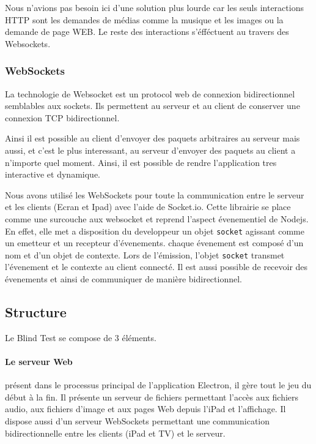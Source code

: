 Nous n'avions pas besoin ici d'une solution plus lourde car les seuls interactions HTTP sont les demandes de médias comme la musique et les images ou la demande de page WEB.
Le reste des interactions s'éfféctuent au travers des Websockets.

\subsubsection{WebSockets}

La technologie de Websocket est un protocol web de connexion bidirectionnel semblables aux sockets.
Ils permettent au serveur et au client de conserver une connexion TCP bidirectionnel.

Ainsi il est possible au client d'envoyer des paquets arbitraires au serveur mais aussi, et c'est le plus interessant, au serveur d'envoyer des paquets au client a n'importe quel moment.
Ainsi, il est possible de rendre l'application tres interactive et dynamique.

Nous avons utilisé les WebSockets pour toute la communication entre le serveur et les clients (Ecran et Ipad) avec l'aide de Socket.io.
Cette librairie se place comme une surcouche aux websocket et reprend l'aspect évenementiel de Nodejs.
En effet, elle met a disposition du developpeur un objet \texttt{socket} agissant comme un emetteur et un recepteur d'évenements.
chaque évenement est composé d'un nom et d'un objet de contexte.
Lors de l'émission, l'objet \texttt{socket} transmet l'évenement et le contexte au client connecté.
Il est aussi possible de recevoir des évenements et ainsi de communiquer de manière bidirectionnel.

\subsection{Structure}

Le Blind Test se compose de 3 éléments.

\paragraph{Le serveur Web} présent dans le processus principal de l'application Electron, il gère tout le jeu du début à la fin.
Il présente un serveur de fichiers permettant l'accès aux fichiers audio, aux fichiers d'image et aux pages Web depuis l'iPad et l'affichage.
Il dispose aussi d'un serveur WebSockets permettant une communication bidirectionnelle entre les clients (iPad et TV) et le serveur.

